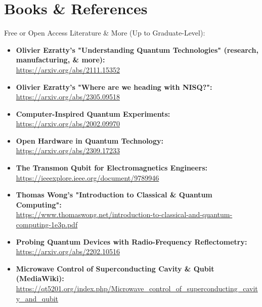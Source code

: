 \chapter{\LARGE{Books \& References}}

\large\begin{flushleft} Free or Open Access Literature \& More (Up to Graduate-Level):
\end{flushleft}

\centering

\normalsize\begin{itemize}

  \item\textbf{Olivier Ezratty's "Understanding Quantum Technologies" (research, manufacturing, \& more):}\\
\url{https://arxiv.org/abs/2111.15352}

  \item\textbf{Olivier Ezratty's "Where are we heading with NISQ?":}\\
\url{https://arxiv.org/abs/2305.09518}

  \item\textbf{Computer-Inspired Quantum Experiments:}\\
\url{https://arxiv.org/abs/2002.09970}

  \item\textbf{Open Hardware in Quantum Technology:}\\
\url{https://arxiv.org/abs/2309.17233}

  \item\textbf{The Transmon Qubit for Electromagnetics Engineers:}\\
\url{https://ieeexplore.ieee.org/document/9789946}

  \item\textbf{Thomas Wong's "Introduction to Classical \& Quantum Computing":}\\
\url{https://www.thomaswong.net/introduction-to-classical-and-quantum-computing-1e3p.pdf}

  \item\textbf{Probing Quantum Devices with Radio-Frequency Reflectometry:}\\
\url{https://arxiv.org/abs/2202.10516}

  \item\textbf{Microwave Control of Superconducting Cavity \& Qubit (MediaWiki):}\\
\url{https://qt5201.org/index.php/Microwave_control_of_superconducting_cavity_and_qubit}


\end{itemize}
